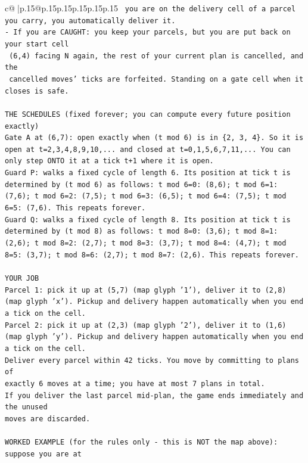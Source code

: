 \documentclass{article}
\begin{document}
{\begin{supertabular}{c@{$\;$}|p{.15\linewidth}@{}p{.15\linewidth}p{.15\linewidth}p{.15\linewidth}p{.15\linewidth}p{.15\linewidth}}
{{{\texttt{     you are on the delivery cell of a parcel you carry, you automatically deliver it.} \\
\texttt{{-} If you are CAUGHT: you keep your parcels, but you are put back on your start cell} \\
\texttt{  (6,4) facing N again, the rest of your current plan is cancelled, and the} \\
\texttt{  cancelled moves' ticks are forfeited. Standing on a gate cell when it closes is safe.} \\
\\ 
\texttt{THE SCHEDULES (fixed forever; you can compute every future position exactly)} \\
\texttt{Gate A at (6,7): open exactly when (t mod 6) is in \{2, 3, 4\}. So it is open at t=2,3,4,8,9,10,... and closed at t=0,1,5,6,7,11,... You can only step ONTO it at a tick t+1 where it is open.} \\
\texttt{Guard P: walks a fixed cycle of length 6. Its position at tick t is determined by (t mod 6) as follows: t mod 6=0: (8,6); t mod 6=1: (7,6); t mod 6=2: (7,5); t mod 6=3: (6,5); t mod 6=4: (7,5); t mod 6=5: (7,6). This repeats forever.} \\
\texttt{Guard Q: walks a fixed cycle of length 8. Its position at tick t is determined by (t mod 8) as follows: t mod 8=0: (3,6); t mod 8=1: (2,6); t mod 8=2: (2,7); t mod 8=3: (3,7); t mod 8=4: (4,7); t mod 8=5: (3,7); t mod 8=6: (2,7); t mod 8=7: (2,6). This repeats forever.} \\
\\ 
\texttt{YOUR JOB} \\
\texttt{Parcel 1: pick it up at (5,7) (map glyph '1'), deliver it to (2,8) (map glyph 'x'). Pickup and delivery happen automatically when you end a tick on the cell.} \\
\texttt{Parcel 2: pick it up at (2,3) (map glyph '2'), deliver it to (1,6) (map glyph 'y'). Pickup and delivery happen automatically when you end a tick on the cell.} \\
\texttt{Deliver every parcel within 42 ticks. You move by committing to plans of} \\
\texttt{exactly 6 moves at a time; you have at most 7 plans in total.} \\
\texttt{If you deliver the last parcel mid{-}plan, the game ends immediately and the unused} \\
\texttt{moves are discarded.} \\
\\ 
\texttt{WORKED EXAMPLE (for the rules only {-} this is NOT the map above): suppose you are at} \\
}}}
\end{supertabular}}
\end{document}

